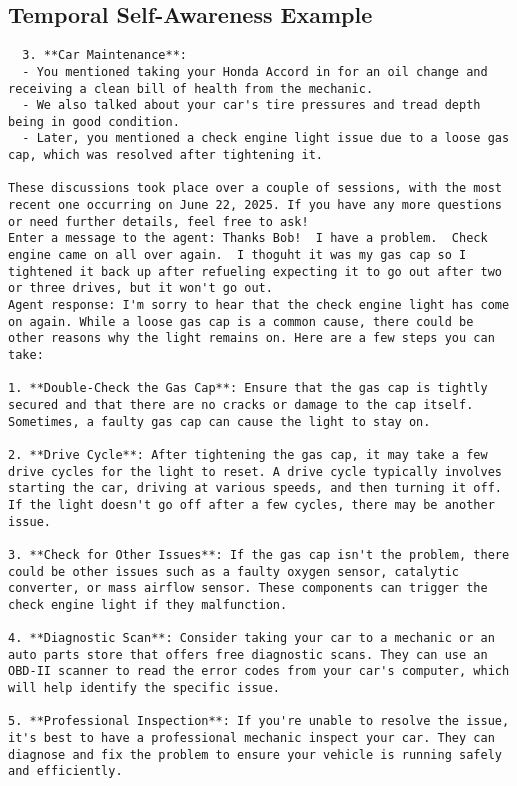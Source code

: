 \documentclass[11pt]{article}
\begin{document}
\subsection{Temporal Self-Awareness Example}
\begin{verbatim}
  3. **Car Maintenance**:
  - You mentioned taking your Honda Accord in for an oil change and receiving a clean bill of health from the mechanic.
  - We also talked about your car's tire pressures and tread depth being in good condition.
  - Later, you mentioned a check engine light issue due to a loose gas cap, which was resolved after tightening it.

These discussions took place over a couple of sessions, with the most recent one occurring on June 22, 2025. If you have any more questions or need further details, feel free to ask!
Enter a message to the agent: Thanks Bob!  I have a problem.  Check engine came on all over again.  I thoguht it was my gas cap so I tightened it back up after refueling expecting it to go out after two or three drives, but it won't go out.
Agent response: I'm sorry to hear that the check engine light has come on again. While a loose gas cap is a common cause, there could be other reasons why the light remains on. Here are a few steps you can take:

1. **Double-Check the Gas Cap**: Ensure that the gas cap is tightly secured and that there are no cracks or damage to the cap itself. Sometimes, a faulty gas cap can cause the light to stay on.

2. **Drive Cycle**: After tightening the gas cap, it may take a few drive cycles for the light to reset. A drive cycle typically involves starting the car, driving at various speeds, and then turning it off. If the light doesn't go off after a few cycles, there may be another issue.

3. **Check for Other Issues**: If the gas cap isn't the problem, there could be other issues such as a faulty oxygen sensor, catalytic converter, or mass airflow sensor. These components can trigger the check engine light if they malfunction.

4. **Diagnostic Scan**: Consider taking your car to a mechanic or an auto parts store that offers free diagnostic scans. They can use an OBD-II scanner to read the error codes from your car's computer, which will help identify the specific issue.

5. **Professional Inspection**: If you're unable to resolve the issue, it's best to have a professional mechanic inspect your car. They can diagnose and fix the problem to ensure your vehicle is running safely and efficiently.

\end{verbatim}
\end{document}
